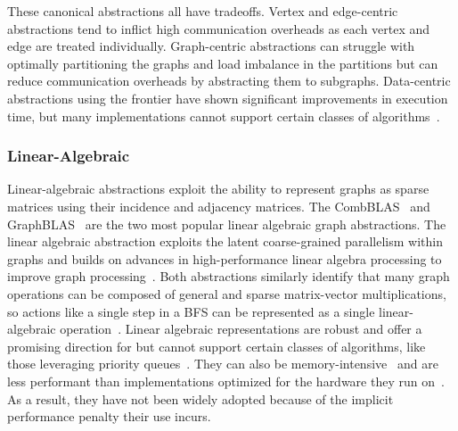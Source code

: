 These canonical abstractions all have tradeoffs. 
Vertex and edge-centric abstractions tend to inflict high communication overheads as each vertex and edge are treated individually. 
Graph-centric abstractions can struggle with optimally partitioning the graphs and load imbalance in the partitions but can reduce communication overheads by abstracting them to subgraphs.
Data-centric abstractions using the frontier have shown significant improvements in execution time, but many implementations cannot support certain classes of algorithms~\cite{Dhulipala2017}.

\subsubsection{Linear-Algebraic}
Linear-algebraic abstractions exploit the ability to represent graphs as sparse matrices using their incidence and adjacency matrices. 
The \ac{CombBLAS}~\cite{Buluc2011, Azad2021} and \ac{GraphBLAS}~\cite{Mattson2013, Kepner2015} are the two most popular linear algebraic graph abstractions. 
The linear algebraic abstraction exploits the latent coarse-grained parallelism within graphs and builds on advances in high-performance linear algebra processing to improve graph processing~\cite{Buluc2011}. 
Both abstractions similarly identify that many graph operations can be composed of general and sparse matrix-vector multiplications, so actions like a single step in a \ac{BFS} can be represented as a single linear-algebraic operation~\cite{Kepner2016}.
Linear algebraic representations are robust and offer a promising direction for \gai but cannot support certain classes of algorithms, like those leveraging priority queues~\cite{Buluc2011}. 
They can also be memory-intensive~\cite{Sundaram2015} and are less performant than implementations optimized for the hardware they run on~\cite{Azad2020}.
As a result, they have not been widely adopted because of the implicit performance penalty their use incurs. 


